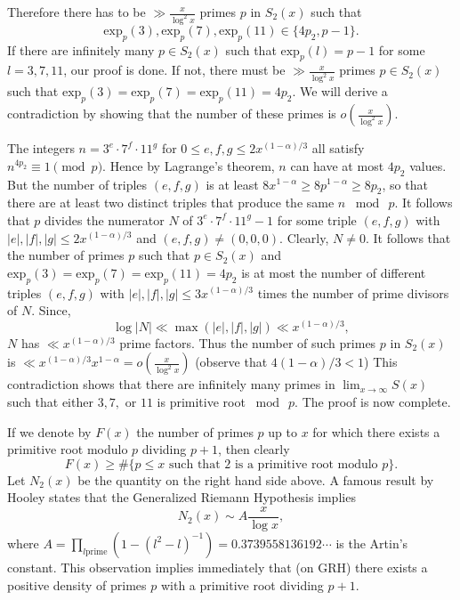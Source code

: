 \documentclass{elsart}
\begin{document}
\begin{pf}
Therefore there has to be  $\gg \tfrac{x}{\log^2 x}$ primes $p$ in $S_2(x)$ such that
\[
\mbox{exp}_p(3), \mbox{exp}_p(7), \mbox{exp}_p(11) \in \{4p_2, p-1\}.
\]
If there are infinitely many $p \in S_2(x)$ such  that $\mbox{exp}_p(l) = p - 1$ for some $l=3,7,11$, our proof is done. If not, there must be $\gg \tfrac{x}{\log^2 x}$ primes $p\in S_2(x)$ such that $\mbox{exp}_p(3) = \mbox{exp}_p(7) = \mbox{exp}_p(11) = 4p_2$. We will derive a contradiction by showing that the number of these primes is $o\left(\tfrac{x}{\log^2 x}\right)$.

The integers $n = 3^e \cdot 7^f \cdot 11^g$ for $0 \leq e,f,g \leq 2x^{(1-\alpha)/3}$ all satisfy $n^{4p_2} \equiv 1 \pmod{p}$.
Hence by Lagrange's theorem, $n$ can have at most $4p_2$ values. But the number of triples $(e,f,g)$ is at least $8x^{1-\alpha} \geq 8p^{1-\alpha} \geq 8p_2$, so that there are at least two distinct triples that produce the same $n$ $\bmod\ p$. It follows that $p$ divides the numerator $N$ of $3^e \cdot 7^f \cdot 11^g - 1$ for some triple $(e,f,g)$ with $ |e|,|f|,|g| \leq 2x^{(1-\alpha)/3}$ and $(e,f,g) \neq (0,0,0)$. Clearly, $N\neq 0$. It follows that the number of primes $p$ such that  $p \in S_2(x)$ and $\mbox{exp}_p(3) = \mbox{exp}_p(7) = \mbox{exp}_p(11) = 4p_2$ is at most the number of different triples $(e,f,g)$ with $ |e|,|f|,|g| \leq 3x^{(1-\alpha)/3}$ times the number of prime divisors of $N$. Since,
\[
\log |N| \ll \max\left( |e|, |f|, |g| \right) \ll x^{(1-\alpha)/3},
\]
$N$ has $\ll x^{(1-\alpha)/3}$ prime factors. Thus the number of such primes $p$ in $S_2(x)$ is $ \ll x^{(1-\alpha)/3} x^{1-\alpha}  = o\left(\tfrac{x}{\log^2 x}\right)$ (observe that $4(1-\alpha)/3 < 1$)
This contradiction shows that there are infinitely many primes in $\lim_{x\rightarrow\infty}S(x)$ such that either $3,7,$ or $11$ is primitive root $\bmod\ p$. The proof is now complete.


\end{pf}


If we denote by $F(x)$ the number of primes $p$ up to $x$ for which
there exists a primitive root modulo $p$ dividing $p+1$, then
clearly
\[
F(x)\geq \#\{p\leq x\textrm{ such that }2\textrm{ is a
primitive root modulo }p\}.
\]
Let $N_2(x)$ be the quantity on the
right hand side above. A famous result by Hooley \cite{Hooley}
states that the Generalized Riemann Hypothesis implies
 \[
 N_2(x)\sim A \frac x{\log x},
 \]
where $A=\prod_{l\textrm{
prime}}\left(1-(l^2-l)^{-1}\right)=0.3739558136192\cdots$ is the
Artin's constant. This observation implies immediately that (on GRH)
there exists a positive density of primes $p$ with a primitive root
dividing $p+1$.
\end{document}
